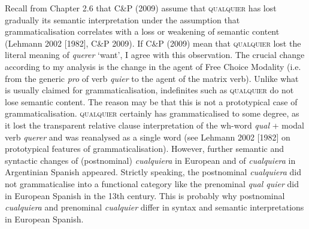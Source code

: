 \documentclass[10pt]{article}
\newenvironment{styleStandard}{\renewcommand\baselinestretch{1.25}\setlength\leftskip{0cm}\setlength\rightskip{0cm}\setlength\parindent{0cm}\setlength\parfillskip{0pt plus 1fil}\setlength\parskip{0in plus 1pt}\writerlistparindent\writerlistleftskip\leavevmode\normalfont\normalsize\fontsize{12pt}{14.4pt}\selectfont\writerlistlabel\ignorespaces}{\unskip\vspace{0in plus 1pt}\par}
\newcommand\writerlistleftskip{}
\newcommand\writerlistparindent{}
\newcommand\writerlistlabel{}
\begin{document}
\begin{styleStandard}
Recall from Chapter 2.6 that C\&P (2009) assume that \textsc{qualquier} has lost gradually its semantic interpretation under the assumption that grammaticalisation correlates with a loss or weakening of semantic content (Lehmann 2002 [1982], C\&P 2009). If C\&P (2009) mean that \textsc{qualquier} lost the literal meaning of \textit{querer} ‘want’, I agree with this observation. The crucial change according to my analysis is the change in the agent of Free Choice Modality (i.e. from the generic \textit{pro} of verb \textit{quier} to the agent of the matrix verb). Unlike what is usually claimed for grammaticalisation, indefinites such as \textsc{qualquier} do not lose semantic content. The reason may be that this is not a prototypical case of grammaticalisation. \textsc{qualquier} certainly has grammaticalised to some degree, as it lost the transparent relative clause interpretation of the wh-word \textit{qual} + modal verb \textit{querer }and was reanalysed as a single word (see Lehmann 2002 [1982] on prototypical features of grammaticalisation). However, further semantic and syntactic changes of (postnominal) \textit{cualquiera} in European and of \textit{cualquiera} in Argentinian Spanish appeared. Strictly speaking, the postnominal \textit{cualquiera} did not grammaticalise into a functional category like the prenominal \textit{qual quier }did in European Spanish in the 13th century. This is probably why postnominal \textit{cualquiera} and prenominal \textit{cualquier} differ in syntax and semantic interpretations in European Spanish. 
\end{styleStandard}
\end{document}

